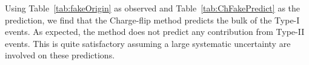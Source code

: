 Using Table~\ref{tab:fakeOrigin} as observed and Table~\ref{tab:ChFakePredict} as the 
prediction, we find that the Charge-flip method predicts the bulk of the Type-I events. As expected,
the method does not predict any contribution from Type-II events. This is quite satisfactory
assuming a large systematic uncertainty are involved on these predictions.

